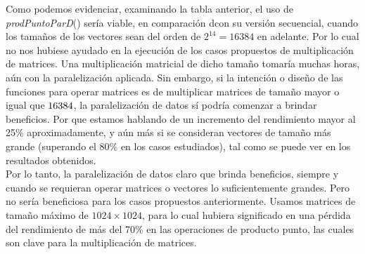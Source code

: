 \documentclass{article}
\begin{document}
Como podemos evidenciar, examinando la tabla anterior, el uso de \textit{prodPuntoParD}() sería viable, en comparación dcon su versión secuencial, cuando los tamaños de los vectores sean del orden de \(2^{14} = 16384\) en adelante. Por lo cual no nos hubiese ayudado en la ejecución de los casos propuestos de multiplicación de matrices. Una multiplicación matricial de dicho tamaño tomaría muchas horas, aún con la paralelización aplicada. Sin embargo, si la intención o diseño de las funciones para operar matrices es de multiplicar matrices de tamaño mayor o igual que \(16384 \time 16384\), la paralelización de datos sí podría comenzar a brindar beneficios. Por que estamos hablando de un incremento del rendimiento mayor al 25\% aproximadamente, y aún más si se consideran vectores de tamaño más grande (superando el 80\% en los casos estudiados), tal como se puede ver en los resultados obtenidos.\\

Por lo tanto, la paralelización de datos claro que brinda beneficios, siempre y cuando se requieran operar matrices o vectores lo suficientemente grandes. Pero no sería beneficiosa para los casos propuestos anteriormente. Usamos matrices de tamaño máximo de \(1024 \times 1024\), para lo cual hubiera significado en una pérdida del rendimiento de más del 70\% en las operaciones de producto punto, las cuales son clave para la multiplicación de matrices.

\clearpage
\end{document}
